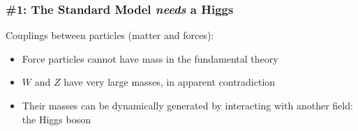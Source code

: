 \documentclass[compress]{beamer}
\begin{document}
\begin{frame}
\frametitle{\#1: The Standard Model {\it needs} a Higgs}

Couplings between particles (matter and forces):
\begin{center}
\end{center}

\vspace{-1 cm}
\begin{itemize}
\item<2-3> Force particles cannot have mass in the fundamental theory
\item<2-3> $W$ and $Z$ have very large masses, in apparent contradiction
\item<3> Their masses can be dynamically generated by interacting with another field: the Higgs boson
\end{itemize}
\end{frame}
\end{document}
